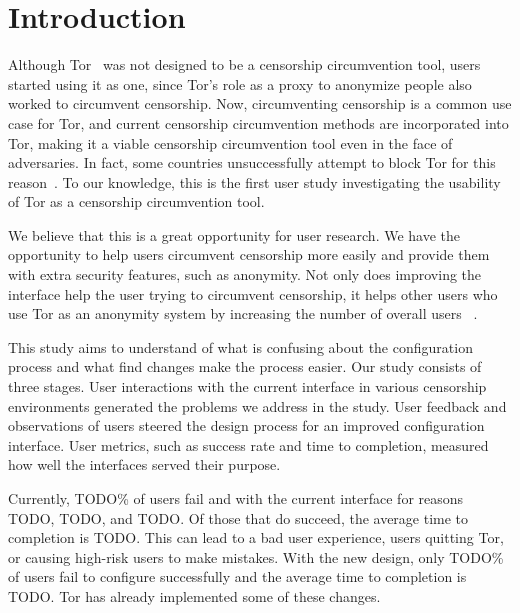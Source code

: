 \documentclass[USenglish,oneside,twocolumn]{article}
\begin{document}


\maketitle

\section{Introduction}

Although Tor~\cite{dingledine2004tor} was not designed to be a censorship circumvention tool, users started
using it as one, since Tor's role as a proxy to anonymize
people also worked to circumvent censorship. Now, circumventing censorship is a
common use case for Tor, and current censorship circumvention methods are
incorporated into Tor, making it a viable censorship circumvention tool even in the face
of adversaries. In fact, some countries unsuccessfully attempt to block Tor for this reason~\cite{winter2012great}. 
To our knowledge, this is the first user study investigating the usability of Tor as a 
censorship circumvention tool.

We believe that this is a great opportunity for user research. We have the opportunity to help users circumvent censorship more easily and provide them with extra security features, such as anonymity. Not only does improving the interface help the user trying to circumvent censorship, it helps other users who use Tor as an anonymity system by increasing the number of overall users ~\cite{dingledine2006anonymity}. 

This study aims to understand of what is confusing about the configuration process and what find changes make the process easier. Our study consists of three stages. User interactions with the current interface in various censorship environments generated the problems we address in the study. User feedback and observations of users steered the design process for an improved configuration interface. User metrics, such as success rate and time to completion, measured how well the interfaces served their purpose.  

Currently, {\color {red} TODO}\% of users fail and with the current interface for reasons {\color {red} TODO}, {\color {red} TODO}, and {\color {red} TODO}. Of those that do succeed, the average time to completion is {\color {red} TODO}. This can lead to a bad user experience, users quitting Tor, or causing high-risk users to make mistakes. With the new design, only {\color {red} TODO}\% of users fail to configure successfully and the average time to completion is {\color {red} TODO}. Tor has already implemented some of these changes.
\end{document}
